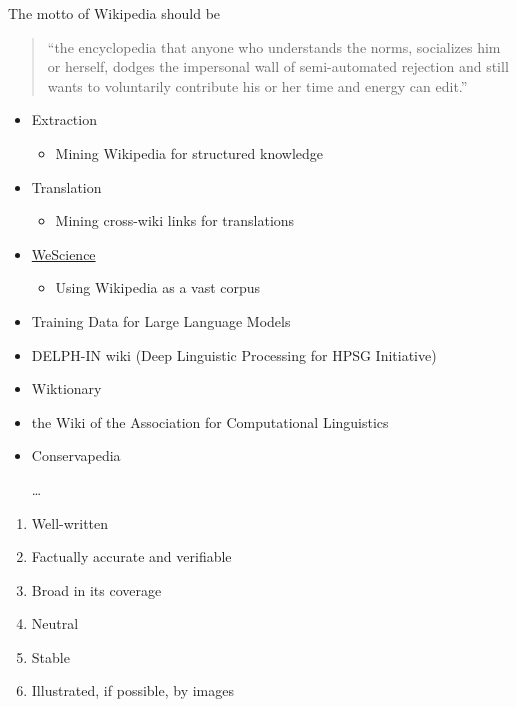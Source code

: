 \documentclass[a4paper,landscape,headrule,footrule,xetex]{foils}
\begin{document}
\begin{large}
  The motto of Wikipedia should be 
  \begin{quote}
    ``the encyclopedia that anyone who understands the norms,
    socializes him or herself, dodges the impersonal wall of
    semi-automated rejection and still wants to voluntarily contribute
    his or her time and energy can edit.''
  \end{quote}
\end{large}

\MyLogo{}

\begin{itemize}
\item Extraction
  \begin{itemize}
  \item Mining Wikipedia for structured knowledge
  \end{itemize}
\item Translation
  \begin{itemize}
  \item Mining cross-wiki links for translations 
  \end{itemize}
\item \href{http://moin.delph-in.net/WeScience}{WeScience}
  \begin{itemize}
  \item Using Wikipedia as a vast corpus
  \end{itemize}
\item Training Data for Large Language Models
\end{itemize}

\begin{itemize}
\item DELPH-IN wiki (Deep Linguistic Processing for HPSG Initiative)
\item Wiktionary
\item the Wiki of the Association for Computational Linguistics
\item Conservapedia
\item[\ldots]
\end{itemize}



\begin{enumerate}
\item Well-written
\item Factually accurate and verifiable
\item Broad in its coverage
\item Neutral
\item Stable
\item Illustrated, if possible, by images
\end{enumerate}
\end{document}
